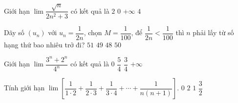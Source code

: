 \begin{ex}%
	Giới hạn $\lim\dfrac{\sqrt{n}}{2n^2+3}$ có kết quả là 
	\choice
	{$2$}
	{\True $0$}
	{$+\infty$}
	{$4$}
\end{ex}
\begin{ex}%
	Dãy số $(u_n)$ với $u_n=\dfrac{1}{2n}$, chọn $M=\dfrac{1}{100}$, để $\dfrac{1}{2n}<\dfrac{1}{100}$ thì $n$ phải lấy từ số hạng thứ bao nhiêu trở đi?
	\choice
	{\True $51$}
	{$49$}
	{$48$}
	{$50$}
\end{ex}
\begin{ex}%
	Giới hạn $\lim\dfrac{3^n+2^n}{4^n}$ có kết quả là 
	\choice
	{\True $0$}
	{$\dfrac{5}{4}$}
	{$\dfrac{3}{4}$}
	{$+\infty$}
\end{ex}
\begin{ex}%
	Tính giới hạn $\lim\left[\dfrac{1}{1\cdot 2}+\dfrac{1}{2\cdot 3}+\dfrac{1}{3\cdot 4}+\cdots +\dfrac{1}{n(n+1)}\right]$. 
	\choice
	{$0$}
	{$2$}
	{\True $1$}
	{$\dfrac{3}{2}$}
\end{ex}

